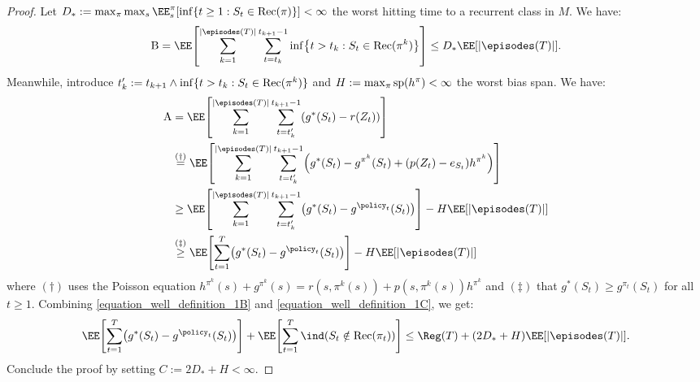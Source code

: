 \documentclass[preprint,cleveref,12pt]{colt2025}
\DeclarePairedDelimiter{\braces}{\{}{\}}	%
\DeclarePairedDelimiter{\brackets}{[}{]}	%
\DeclarePairedDelimiter{\parens}{(}{)}	%
\DeclarePairedDelimiter{\abs}{\lvert}{\rvert}	%
\newcommand{\eqindicator}[1]{\ind\parens*{#1}}
\newcommand{\vecspan}[1]{\mathrm{sp}\parens{#1}}
\begin{document}
\begin{proof}
        Let $D_* := \max_{\pi} \max_s \EE_s^\pi[\inf\braces{t \ge 1 : S_t \in \mathrm{Rec}(\pi)}] < \infty$ the worst hitting time to a recurrent class in $M$. 
        We have:
        \begin{equation}
        \label{equation_well_definition_1B}
            \mathrm{B}
            =
            \EE \brackets*{
                \sum_{k=1}^{\abs*{\episodes(T)}} \sum_{t=t_k}^{t_{k+1}-1}
                \inf\braces*{t > t_k : S_t \in \mathrm{Rec}(\pi^k)}
            }
            \le
            D_* \EE[\abs*{\episodes(T)}]
            .
        \end{equation}
        Meanwhile, introduce $t'_k := t_{k+1} \wedge \inf \braces{t > t_k: S_t \in \mathrm{Rec}(\pi^k)}$ and $H := \max_\pi \vecspan{h^\pi} < \infty$ the worst bias span.
        We have:
        \begin{align}
            \mathrm{A}
            & = \nonumber
            \EE \brackets*{
                \sum_{k=1}^{\abs*{\episodes(T)}} \sum_{t=t'_k}^{t_{k+1}-1}
                (g^*(S_t) - r(Z_t))
            }
            \\
            & \overset{(\dagger)}= \nonumber
            \EE \brackets*{
                \sum_{k=1}^{\abs*{\episodes(T)}} \sum_{t=t'_k}^{t_{k+1}-1}
                \parens*{
                    g^*(S_t) - g^{\pi^k}(S_t) + \parens*{p(Z_t) - e_{S_t}}h^{\pi^k}
                }
            }
            \\
            & \ge \nonumber
            \EE \brackets*{
                \sum_{k=1}^{\abs*{\episodes(T)}} \sum_{t=t'_k}^{t_{k+1}-1}
                \parens*{
                    g^*(S_t) - g^{\policy_t}(S_t) 
                }
            }
            - H \EE[\abs*{\episodes(T)}]
            \\
            & \overset{(\ddagger)}\ge
        \label{equation_well_definition_1C}
            \EE \brackets*{
                \sum_{t=1}^T
                \parens*{
                    g^*(S_t) - g^{\policy_t}(S_t) 
                }
            }
            - H \EE[\abs*{\episodes(T)}]
        \end{align}
        where $(\dagger)$ uses the Poisson equation $h^{\pi^k}(s) + g^{\pi^k}(s) = r(s, \pi^k(s)) + p(s, \pi^k(s)) h^{\pi^k}$ and $(\ddagger)$ that $g^*(S_t) \ge g^{\pi_t}(S_t)$ for all $t \ge 1$.
        Combining \eqref{equation_well_definition_1B} and \eqref{equation_well_definition_1C}, we get:
        \begin{equation*}
            \EE \brackets*{
                \sum_{t=1}^T
                \parens*{
                    g^*(S_t) - g^{\policy_t}(S_t) 
                }
            }
            +
            \EE\brackets*{
                \sum_{t=1}^T \eqindicator{S_t \notin \mathrm{Rec}(\pi_t)}
            }
            \le
            \Reg(T)
            + (2D_* + H) \EE[\abs*{\episodes(T)}]
            .
        \end{equation*}
        Conclude the proof by setting $C := 2 D_* + H < \infty$.
    \end{proof}
\end{document}
